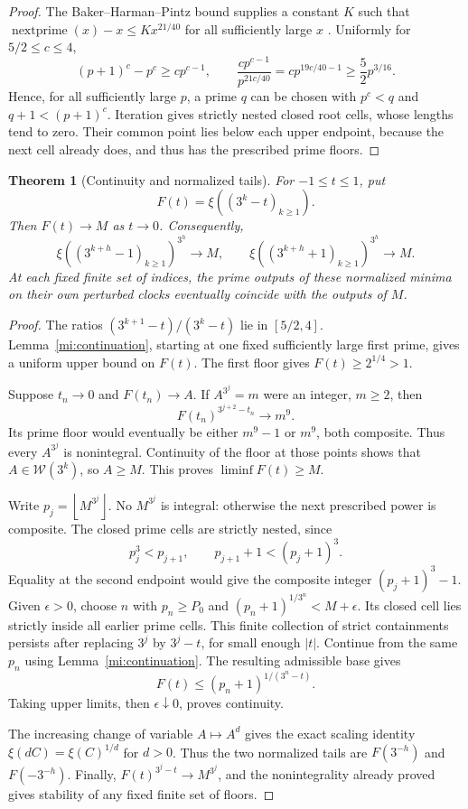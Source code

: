 \documentclass[11pt,a4paper]{article}
\numberwithin{equation}{section}
\newtheorem{theorem}{Theorem}[section]
\theoremstyle{definition}
\theoremstyle{remark}
\newcommand{\floor}[1]{\left\lfloor #1\right\rfloor}
\begin{document}
\begin{proof}
The Baker--Harman--Pintz bound supplies a constant \(K\) such that
\(\operatorname{nextprime}(x)-x\le Kx^{21/40}\) for all sufficiently
large \(x\) \cite{BHP2001}. Uniformly for \(5/2\le c\le4\),
\[
 (p+1)^c-p^c\ge cp^{c-1},\qquad
 \frac{cp^{c-1}}{p^{21c/40}}
 =cp^{19c/40-1}\ge\frac52p^{3/16}.
\]
Hence, for all sufficiently large \(p\), a prime \(q\) can be
chosen with \(p^c<q\) and \(q+1<(p+1)^c\).
Iteration gives strictly nested closed root cells, whose lengths
tend to zero. Their common point lies below each upper endpoint,
because the next cell already does, and thus has the prescribed
prime floors.
\end{proof}

\begin{theorem}[Continuity and normalized tails]
\label{mi:tail-limit}
For \(-1\le t\le1\), put
\[
 F(t)=\xi((3^k-t)_{k\ge1}).
\]
Then \(F(t)\to M\) as \(t\to0\). Consequently,
\[
 \xi((3^{k+h}-1)_{k\ge1})^{3^h}\longrightarrow M,\qquad
 \xi((3^{k+h}+1)_{k\ge1})^{3^h}\longrightarrow M.
\]
At each fixed finite set of indices, the prime outputs of these
normalized minima on their own perturbed clocks eventually
coincide with the outputs of \(M\).
\end{theorem}

\begin{proof}
The ratios \((3^{k+1}-t)/(3^k-t)\) lie in \([5/2,4]\).
Lemma~\ref{mi:continuation}, starting at one fixed sufficiently
large first prime, gives a uniform upper bound on \(F(t)\).
The first floor gives \(F(t)\ge2^{1/4}>1\).

Suppose \(t_n\to0\) and \(F(t_n)\to A\). If \(A^{3^j}=m\)
were an integer, \(m\ge2\), then
\[
 F(t_n)^{3^{j+2}-t_n}\longrightarrow m^9.
\]
Its prime floor would eventually be either \(m^9-1\) or \(m^9\),
both composite. Thus every \(A^{3^j}\) is nonintegral. Continuity
of the floor at those points shows that \(A\in\mathcal W(3^k)\),
so \(A\ge M\). This proves \(\liminf F(t)\ge M\).

Write \(p_j=\floor{M^{3^j}}\). No \(M^{3^j}\) is integral:
otherwise the next prescribed power is composite. The closed
prime cells are strictly nested, since
\[
 p_j^3<p_{j+1},\qquad p_{j+1}+1<(p_j+1)^3.
\]
Equality at the second endpoint would give the composite integer
\((p_j+1)^3-1\). Given \(\epsilon>0\), choose \(n\) with
\(p_n\ge P_0\) and
\((p_n+1)^{1/3^n}<M+\epsilon\). Its closed cell lies strictly
inside all earlier prime cells. This finite collection of strict
containments persists after replacing \(3^j\) by \(3^j-t\), for
small enough \(|t|\). Continue from the same \(p_n\) using
Lemma~\ref{mi:continuation}. The resulting admissible base gives
\[
 F(t)\le(p_n+1)^{1/(3^n-t)}.
\]
Taking upper limits, then \(\epsilon\downarrow0\), proves
continuity.

The increasing change of variable \(A\mapsto A^d\) gives the
exact scaling identity \(\xi(dC)=\xi(C)^{1/d}\) for \(d>0\).
Thus the two normalized tails are \(F(3^{-h})\) and
\(F(-3^{-h})\). Finally,
\(F(t)^{3^j-t}\to M^{3^j}\), and the nonintegrality already
proved gives stability of any fixed finite set of floors.
\end{proof}
\end{document}
